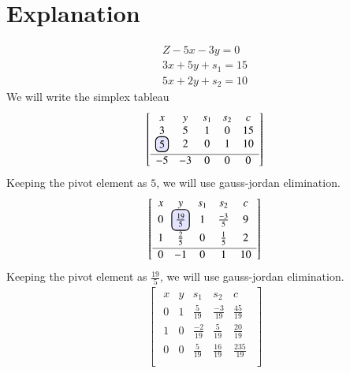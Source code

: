 \documentclass[journal,12pt,twocolumn]{IEEEtran}
\begin{document}
\section{Explanation}
\begin{align}
Z-5x-3y=0\\
3x+5y+s_1=15\\
5x+2y+s_2=10
\end{align}
We will write the simplex tableau
\begin{align}
\begin{bmatrix}
\begin{array}{ccccc}
  x & y & s_1 & s_2 & c  \\ 
  3 & 5 & 1 & 0 & 15 \\ 
  \hlight{5} & 2 & 0 & 1 & 10  \\[0.1cm] \hline
  -5 & -3 & 0 & 0 & 0 \\
\end{array}
\end{bmatrix}
\end{align}
Keeping the pivot element as $5$, we will use gauss-jordan elimination.
\begin{align}
\begin{bmatrix}
\begin{array}{ccccc}
  x & y & s_1 & s_2 & c  \\[0.1cm] 
  0 & \hlight{\frac{19}{5}} & 1 & \frac{-3}{5} & 9 \\[0.15cm] 
  1 & \frac{2}{5} & 0 & \frac{1}{5} & 2  \\[0.1cm] \hline
  0 & -1 & 0 & 1 & 10 \\
\end{array}
\end{bmatrix}
\end{align}
Keeping the pivot element as $\frac{19}{5}$, we will use gauss-jordan elimination.
\begin{align}
\begin{bmatrix}
\begin{array}{ccccc}
  x & y & s_1 & s_2 & c  \\ 
  0 & 1 & \frac{5}{19} & \frac{-3}{19} & \frac{45}{19} \\ 
  1 & 0 & \frac{-2}{19} & \frac{5}{19} & \frac{20}{19}  \\[0.1cm] \hline 
  0 & 0 & \frac{5}{19} & \frac{16}{19} & \frac{235}{19} \\
\end{array}
\end{bmatrix}
\end{align}
\end{document}
